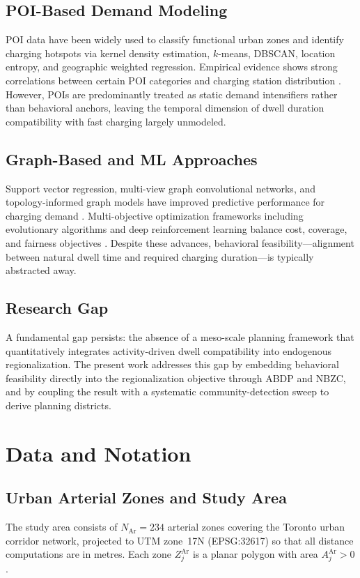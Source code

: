 \documentclass[conference]{IEEEtran}
\begin{document}
\subsection{POI-Based Demand Modeling}
POI data have been widely used to classify functional urban zones and
identify charging hotspots via kernel density estimation, $k$-means,
DBSCAN, location entropy, and geographic weighted regression.
Empirical evidence shows strong correlations between certain POI
categories and charging station distribution \cite{Zechao2024}.
However, POIs are predominantly treated as static demand intensifiers
rather than behavioral anchors, leaving the temporal dimension of dwell
duration compatibility with fast charging largely unmodeled.

\subsection{Graph-Based and ML Approaches}
Support vector regression, multi-view graph convolutional networks, and
topology-informed graph models have improved predictive performance for
charging demand \cite{Wang2023}.
Multi-objective optimization frameworks including evolutionary algorithms
and deep reinforcement learning balance cost, coverage, and fairness
objectives \cite{Sun2024}.
Despite these advances, behavioral feasibility—alignment between natural
dwell time and required charging duration—is typically abstracted away.

\subsection{Research Gap}
A fundamental gap persists: the absence of a meso-scale planning framework
that quantitatively integrates activity-driven dwell compatibility into
endogenous regionalization.
The present work addresses this gap by embedding behavioral feasibility
directly into the regionalization objective through ABDP and NBZC,
and by coupling the result with a systematic community-detection sweep to
derive planning districts.

\section{Data and Notation}

\subsection{Urban Arterial Zones and Study Area}
The study area consists of $N_{\mathrm{Ar}}=234$ arterial zones covering
the Toronto urban corridor network, projected to UTM zone~17N
(EPSG:32617) so that all distance computations are in metres.
Each zone $Z^{\mathrm{Ar}}_j$ is a planar polygon with area
$A^{\mathrm{Ar}}_j>0$.
\end{document}
